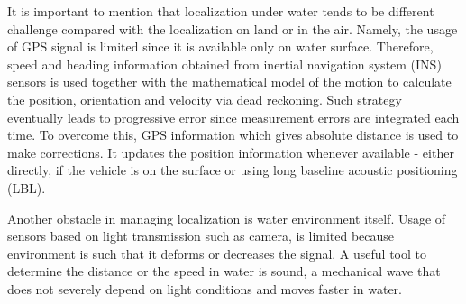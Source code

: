 It is important to mention that localization under water tends to be different challenge compared with the localization on land or in the air. Namely, the usage of GPS signal is limited since it is available only on water surface. Therefore, speed and heading information obtained from inertial navigation system (INS) sensors is used together with the mathematical model of the motion to calculate the position, orientation and velocity via dead reckoning. Such strategy eventually leads to progressive error since measurement errors are integrated each time. To overcome this, GPS information which gives absolute distance is used to make corrections. It updates the position information whenever available - either directly, if the vehicle is on the surface or using long baseline acoustic positioning (LBL).

Another obstacle in managing localization is water environment itself. Usage of sensors based on light transmission such as camera, is limited because environment is such that it deforms or decreases the signal. A useful tool to determine the distance or the speed in water is sound, a mechanical wave that does not severely depend on light conditions and moves faster in water.  